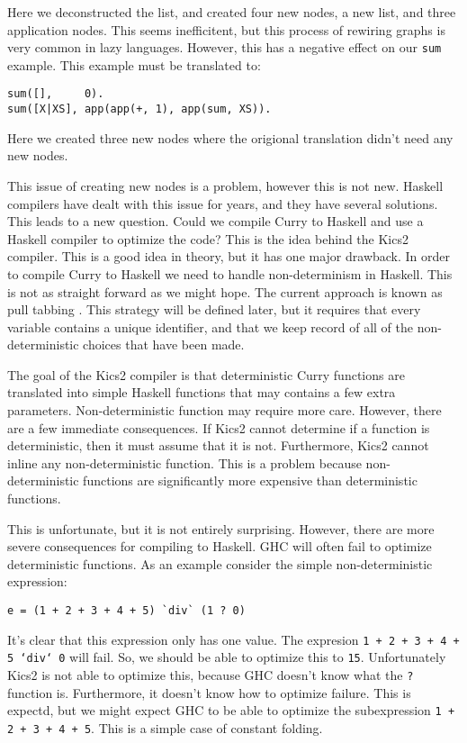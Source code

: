 Here we deconstructed the list, and created four new nodes, a new list, and three application nodes.
This seems inefficitent, but this process of rewiring graphs is very common in lazy languages.
However, this has a negative effect on our \texttt{sum} example.
This example must be translated to:
\begin{verbatim}
sum([],     0).
sum([X|XS], app(app(+, 1), app(sum, XS)).
\end{verbatim}
Here we created three new nodes where the origional translation didn't need any new nodes.

This issue of creating new nodes is a problem, however this is not new.
Haskell compilers have dealt with this issue for years, and they have several solutions.
This leads to a new question.
Could we compile Curry to Haskell and use a Haskell compiler to optimize the code?
This is the idea behind the Kics2 compiler.
This is a good idea in theory, but it has one major drawback.
In order to compile Curry to Haskell we need to handle non-determinism in Haskell.
This is not as straight forward as we might hope.
The current approach is known as pull tabbing \cite{pullTab}.
This strategy will be defined later, but it requires that every variable contains a unique identifier,
and that we keep record of all of the non-deterministic choices that have been made.

The goal of the Kics2 compiler is that deterministic Curry functions are translated into simple Haskell functions
that may contains a few extra parameters.
Non-deterministic function may require more care.
However, there are a few immediate consequences.
If Kics2 cannot determine if a function is deterministic, then it must assume that it is not.
Furthermore, Kics2 cannot inline any non-deterministic function.
This is a problem because non-deterministic functions are significantly more expensive than deterministic functions.

This is unfortunate, but it is not entirely surprising.
However, there are more severe consequences for compiling to Haskell.
GHC will often fail to optimize deterministic functions.
As an example consider the simple non-deterministic expression:
\begin{verbatim}
e = (1 + 2 + 3 + 4 + 5) `div` (1 ? 0)
\end{verbatim}
It's clear that this expression only has one value.  The expresion \texttt{1 + 2 + 3 + 4 + 5 `div` 0} will fail.
So, we should be able to optimize this to \texttt{15}.
Unfortunately Kics2 is not able to optimize this, because GHC doesn't know what the \texttt ? function is.
Furthermore, it doesn't know how to optimize failure.
This is expectd, but we might expect GHC to be able to optimize the subexpression \texttt{1 + 2 + 3 + 4 + 5}.
This is a simple case of constant folding.

